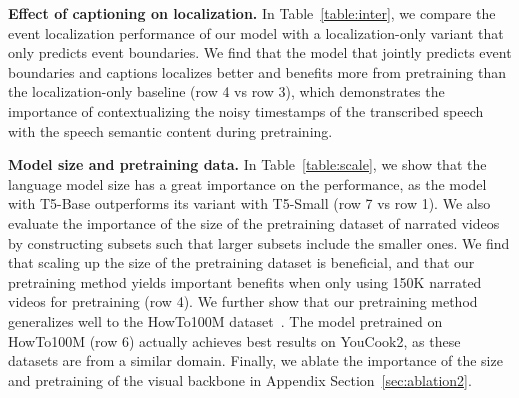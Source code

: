 \noindent \textbf{Effect of captioning on localization.}
In Table~\ref{table:inter}, we compare the event localization performance of our model with a localization-only variant that only predicts event boundaries.
We find that the model that jointly predicts event boundaries and captions localizes better and benefits more from pretraining than the localization-only baseline (row 4 vs row 3), which demonstrates the importance of contextualizing the noisy timestamps of the transcribed speech with the speech semantic content during pretraining.

\noindent \textbf{Model size and pretraining data.}
In Table~\ref{table:scale}, we show that the language model size has a great importance on the performance, as the model with T5-Base outperforms its variant with T5-Small (row 7 vs row 1).
We also evaluate the importance of the size of the pretraining dataset of narrated videos by constructing subsets such that larger subsets include the smaller ones.
We find that scaling up the size of the pretraining dataset is beneficial, and that our pretraining method yields important benefits when only using 150K narrated videos for pretraining (row 4).
We further show that our pretraining method generalizes well to the HowTo100M dataset~\cite{miech19howto100m}.
The model pretrained on HowTo100M (row 6) actually achieves best results on YouCook2, as these datasets are from a similar domain.
Finally, we ablate the importance of the size and pretraining of the visual backbone in Appendix Section~\ref{sec:ablation2}.


